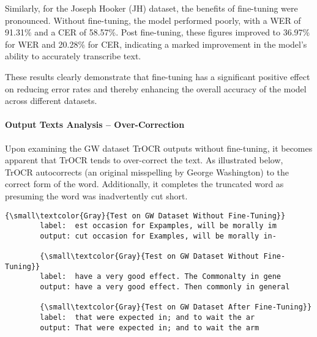 Similarly, for the Joseph Hooker (JH) dataset, the benefits of fine-tuning were pronounced. Without fine-tuning, the model performed poorly, with a WER of 91.31\% and a CER of 58.57\%. Post fine-tuning, these figures improved to 36.97\% for WER and 20.28\% for CER, indicating a marked improvement in the model's ability to accurately transcribe text.

These results clearly demonstrate that fine-tuning has a significant positive effect on reducing error rates and thereby enhancing the overall accuracy of the model across different datasets.


\paragraph*{Output Texts Analysis -- Over-Correction} 
Upon examining the GW dataset TrOCR outputs without fine-tuning, it becomes apparent that TrOCR tends to over-correct the text. As illustrated below, TrOCR autocorrects  (an original misspelling by George Washington) to  the correct form of the word. Additionally, it completes the truncated word  as  presuming the word was inadvertently cut short. 

\begin{center}
    \begin{minipage}{1.0\textwidth}
    \begin{Verbatim}[commandchars=\\\{\}]
        {\small\textcolor{Gray}{Test on GW Dataset Without Fine-Tuning}}
        label:  est occasion for Expamples, will be morally im 
        output: cut occasion for Examples, will be morally in-

        {\small\textcolor{Gray}{Test on GW Dataset Without Fine-Tuning}}
        label:  have a very good effect. The Commonalty in gene
        output: have a very good effect. Then commonly in general

        {\small\textcolor{Gray}{Test on GW Dataset After Fine-Tuning}}
        label:  that were expected in; and to wait the ar
        output: That were expected in; and to wait the arm
    \end{Verbatim}
\end{minipage}
\end{center}

